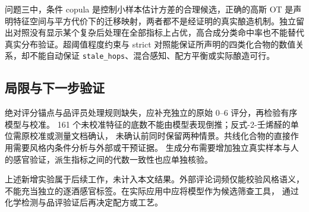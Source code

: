 \documentclass[UTF8,a4paper,zihao=-4]{ctexart}
\numberwithin{figure}{section}
\numberwithin{table}{section}
\numberwithin{equation}{section}
\newcommand{\file}[1]{\texttt{#1}}
\begin{document}
问题三中，条件 copula 是控制小样本估计方差的合理候选，正确的高斯 OT 是声明特征空间与平方代价下的迁移映射，两者都不是经证明的真实酿造机制。独立留出对照没有显示某个复杂后处理在全部指标上占优，高合成分类命中率也不能替代真实分布验证。超阈值程度约束与 strict 对照能保证所声明的四类化合物的数值关系，却不能自动保证 \file{stale\_hops}、混合感知、配方平衡或实际酿造可行。

\subsection{局限与下一步验证}

绝对评分锚点与品评员处理规则缺失，应补充独立的原始 0--6 评分，再检验有序模型与校准。
161 个未校准特征的底数不能由模型表现倒推；反式-2-壬烯醛的单位需原校准或测量文档确认，
未确认前同时保留两种情景。共线化合物的直接作用需要风格内条件分析与外部或干预证据。
生成分布需要增加独立真实样本与人的感官验证，派生指标之间的代数一致性也应单独核验。

上述新增实验属于后续工作，未计入本文结果。外部评论词频仅能校验风格语义，
不能充当独立的逐酒感官标签。在实际应用中应将模型作为候选筛查工具，
通过化学检测与品评验证后再决定配方或工艺。
\end{document}
